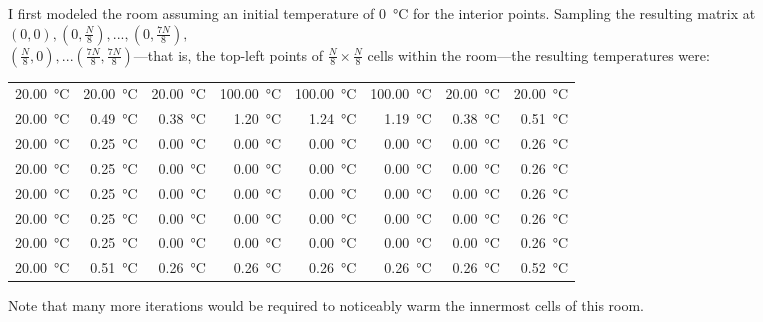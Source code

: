 \documentclass[12pt,letterpaper,oneside]{article}
\begin{document}
I first modeled the room assuming an initial temperature of \SI{0}{\celsius} for the interior points. Sampling the resulting matrix at 
$\left(0, 0\right), \left(0, \frac{N}{8}\right), ..., \left(0, \frac{7N}{8}\right), $\\
$ \left(\frac{N}{8}, 0\right), ... \left(\frac{7N}{8}, \frac{7N}{8}\right)$---that is, the top-left points of $\frac{N}{8}\times\frac{N}{8}$ cells within the room---the resulting temperatures were:
\begin{center}
	\footnotesize
	\begin{tabular}{@{}r r r r r r r r@{}}
		\SI{20.00}{\celsius} & \SI{20.00}{\celsius} & \SI{20.00}{\celsius} & \SI{100.00}{\celsius} & \SI{100.00}{\celsius} & \SI{100.00}{\celsius} & \SI{20.00}{\celsius} & \SI{20.00}{\celsius} \\
		\SI{20.00}{\celsius} & \SI{0.49}{\celsius} & \SI{0.38}{\celsius} & \SI{1.20}{\celsius} & \SI{1.24}{\celsius} & \SI{1.19}{\celsius} & \SI{0.38}{\celsius} & \SI{0.51}{\celsius}  \\
		\SI{20.00}{\celsius} & \SI{0.25}{\celsius} & \SI{0.00}{\celsius} & \SI{0.00}{\celsius} & \SI{0.00}{\celsius} & \SI{0.00}{\celsius} & \SI{0.00}{\celsius} & \SI{0.26}{\celsius} \\
		\SI{20.00}{\celsius} & \SI{0.25}{\celsius} & \SI{0.00}{\celsius} & \SI{0.00}{\celsius} & \SI{0.00}{\celsius} & \SI{0.00}{\celsius} & \SI{0.00}{\celsius} & \SI{0.26}{\celsius} \\
		\SI{20.00}{\celsius} & \SI{0.25}{\celsius} & \SI{0.00}{\celsius} & \SI{0.00}{\celsius} & \SI{0.00}{\celsius} & \SI{0.00}{\celsius} & \SI{0.00}{\celsius} & \SI{0.26}{\celsius} \\
		\SI{20.00}{\celsius} & \SI{0.25}{\celsius} & \SI{0.00}{\celsius} & \SI{0.00}{\celsius} & \SI{0.00}{\celsius} & \SI{0.00}{\celsius} & \SI{0.00}{\celsius} & \SI{0.26}{\celsius} \\
		\SI{20.00}{\celsius} & \SI{0.25}{\celsius} & \SI{0.00}{\celsius} & \SI{0.00}{\celsius} & \SI{0.00}{\celsius} & \SI{0.00}{\celsius} & \SI{0.00}{\celsius} & \SI{0.26}{\celsius} \\
		\SI{20.00}{\celsius} & \SI{0.51}{\celsius} & \SI{0.26}{\celsius} & \SI{0.26}{\celsius} & \SI{0.26}{\celsius} & \SI{0.26}{\celsius} & \SI{0.26}{\celsius} & \SI{0.52}{\celsius}
	\end{tabular}
	\normalsize
\end{center}
Note that many more iterations would be required to noticeably warm the innermost cells of this room.
\end{document}
